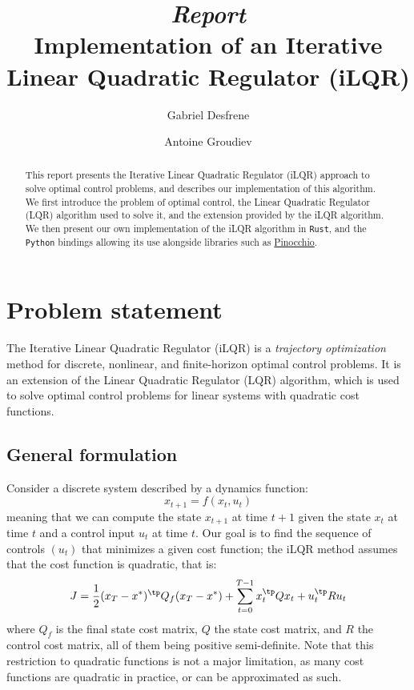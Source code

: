 \documentclass[nodate]{../cs-classes/cs-classes}
\title{\vspace*{-1cm}\textit{Report}\\Implementation of an Iterative Linear Quadratic Regulator (iLQR)}
\author{Gabriel Desfrene\and Antoine Groudiev}
\begin{document}
\begin{abstract}
    This report presents the Iterative Linear Quadratic Regulator (iLQR) approach to solve optimal control problems, and describes our implementation of this algorithm. We first introduce the problem of optimal control, the Linear Quadratic Regulator (LQR) algorithm used to solve it, and the extension provided by the iLQR algorithm. We then present our own implementation of the iLQR algorithm in \texttt{Rust}, and the \texttt{Python} bindings allowing its use alongside libraries such as \href{https://github.com/stack-of-tasks/pinocchio/}{Pinocchio}.
\end{abstract}

\section{Problem statement}
The Iterative Linear Quadratic Regulator (iLQR) is a \emph{trajectory optimization} method for discrete, nonlinear, and finite-horizon optimal control problems. It is an extension of the Linear Quadratic Regulator (LQR) algorithm, which is used to solve optimal control problems for linear systems with quadratic cost functions.

\subsection{General formulation}
Consider a discrete system described by a dynamics function:
\begin{equation*}
    x_{t+1} = f(x_t, u_t)
\end{equation*}
meaning that we can compute the state $x_{t+1}$ at time $t+1$ given the state $x_t$ at time $t$ and a control input $u_t$ at time $t$. Our goal is to find the sequence of controls $(u_t)$ that minimizes a given cost function; the iLQR method assumes that the cost function is quadratic, that is:
\begin{equation*}
    J = \frac{1}{2}(x_T-x^*)^\tp Q_f (x_T-x^*) + \sum_{t=0}^{T-1} x_t^\tp Q x_t + u_t^\tp R u_t
\end{equation*}
where $Q_f$ is the final state cost matrix, $Q$ the state cost matrix, and $R$ the control cost matrix, all of them being positive semi-definite. Note that this restriction to quadratic functions is not a major limitation, as many cost functions are quadratic in practice, or can be approximated as such.
\end{document}
